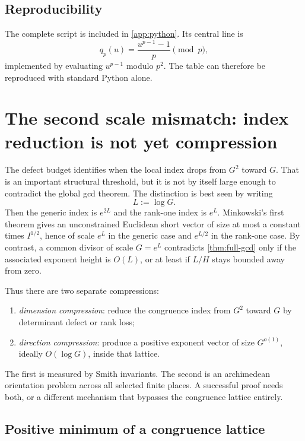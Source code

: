 \documentclass[11pt,oneside]{article}
\theoremstyle{definition}
\begin{document}
\subsection{Reproducibility}

The complete script is included in \cref{app:python}.  Its central line is
\[
  q_p(u)=\frac{u^{p-1}-1}{p}\pmod p,
\]
implemented by evaluating $u^{p-1}$ modulo $p^2$.  The table can therefore
be reproduced with standard Python alone.

\section{The second scale mismatch: index reduction is not yet compression}
\label{sec:compression}

The defect budget identifies when the local index drops from $G^2$ toward
$G$.  That is an important structural threshold, but it is not by itself
large enough to contradict the global gcd theorem.  The distinction is
best seen by writing
\begin{equation}\label{eq:L-logG}
  L:=\log G.
\end{equation}
Then the generic index is $e^{2L}$ and the rank-one index is $e^L$.
Minkowski's first theorem gives an unconstrained Euclidean short vector of
size at most a constant times $I^{1/2}$, hence of scale $e^L$ in the
generic case and $e^{L/2}$ in the rank-one case.  By contrast, a common
divisor of scale $G=e^L$ contradicts \cref{thm:full-gcd} only if the
associated exponent height is $O(L)$, or at least if $L/H$ stays bounded
away from zero.

Thus there are two separate compressions:
\begin{enumerate}
  \item \emph{dimension compression}: reduce the congruence index from
        $G^2$ toward $G$ by determinant defect or rank loss;
  \item \emph{direction compression}: produce a positive exponent vector
        of size $G^{o(1)}$, ideally $O(\log G)$, inside that lattice.
\end{enumerate}
The first is measured by Smith invariants.  The second is an archimedean
orientation problem across all selected finite places.  A successful
proof needs both, or a different mechanism that bypasses the congruence
lattice entirely.

\subsection{Positive minimum of a congruence lattice}
\end{document}
